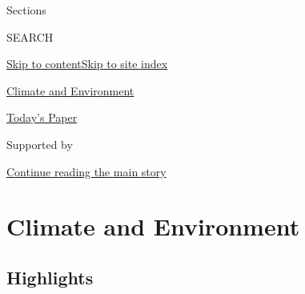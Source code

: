 Sections

SEARCH

\protect\hyperlink{site-content}{Skip to
content}\protect\hyperlink{site-index}{Skip to site index}

\href{https://www.nytimes3xbfgragh.onion/section/climate}{Climate and
Environment}

\href{https://myaccount.nytimes3xbfgragh.onion/auth/login?response_type=cookie\&client_id=vi}{}

\href{https://www.nytimes3xbfgragh.onion/section/todayspaper}{Today's
Paper}

Supported by

\protect\hyperlink{after-sponsor}{Continue reading the main story}

\hypertarget{climate-and-environment}{%
\section{Climate and Environment}\label{climate-and-environment}}

\hypertarget{highlights}{%
\subsection{Highlights}\label{highlights}}

